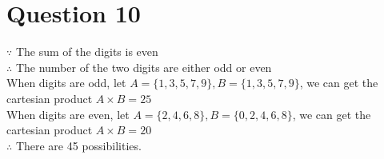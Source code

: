 \documentclass[11pt, oneside]{article}   	%
\begin{document}
\section*{Question 10}
$\because$ The sum of the digits is even\\
$\therefore$ The number of the two digits are either odd or even\\
When digits are odd, let $A=\{1, 3, 5, 7, 9\}, B=\{1, 3, 5, 7, 9\}$, we can get the cartesian product $A \times B =25$\\
When digits are even, let $A=\{2, 4, 6, 8\}, B=\{0, 2, 4, 6, 8\}$, we can get the cartesian product $A \times B =20$\\
$\therefore$ There are 45 possibilities.
\end{document}

